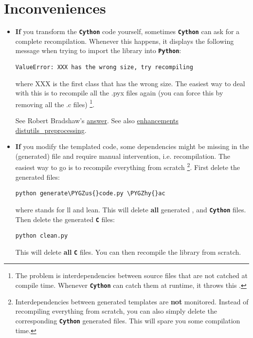 \documentclass[letterpaper,10pt,english]{sphinxmanual}
\def\PYGZus{\char`\_}
\def\PYGZhy{\char`\-}
\begin{document}
\section{Inconveniences}
\label{installation:inconveniences}\begin{itemize}
\item {} 
\textbf{If} you transform the \textbf{\texttt{Cython}} code yourself, sometimes \textbf{\texttt{Cython}} can ask for a complete recompilation.
Whenever this happens, it displays the following message when trying to import the library
into \textbf{\texttt{Python}}:

\begin{Verbatim}[commandchars=\\\{\}]
ValueError: XXX has the wrong size, try recompiling
\end{Verbatim}

where XXX is the first class that has the wrong size. The easiest way to deal with this is to recompile all the .pyx files again (you can force this by removing
all the .c files) \footnote{
The problem is interdependencies between source files that are not catched at compile time. Whenever \textbf{\texttt{Cython}} can catch them at runtime, it throws this .
}.

See Robert Bradshaw's \href{https://groups.google.com/forum/?hl=en\#!topic/cython-users/cOAVM0whJkY}{answer}.
See also \href{https://github.com/cython/cython/wiki/enhancements-distutils\_preprocessing}{enhancements distutils\_preprocessing}.

\item {} 
\textbf{If} you modify the templated code, some dependencies might be missing in the (generated)  file and require manual intervention,
i.e. recompilation. The easiest way to go is to recompile everything from scratch \footnote{
Interdependencies between generated templates are \textbf{not} monitored. Instead of recompiling everything from scratch, you can also simply delete the corresponding \textbf{\texttt{Cython}} generated files. This will spare you some compilation time.
}. First delete the generated files:

\begin{Verbatim}[commandchars=\\\{\}]
python generate\PYGZus{}code.py \PYGZhy{}ac
\end{Verbatim}

where  stands for ll and lean. This will delete \textbf{all} generated ,  and  \textbf{\texttt{Cython}} files. Then delete the generated \textbf{\texttt{C}} files:

\begin{Verbatim}[commandchars=\\\{\}]
python clean.py
\end{Verbatim}

This will delete \textbf{all} \textbf{\texttt{C}}  files. You can then recompile the library from scratch.

\end{itemize}
\end{document}
